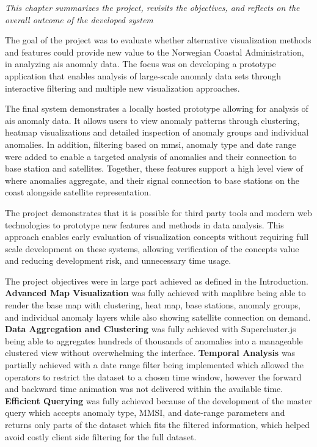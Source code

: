 
\textit{This chapter summarizes the project, revisits the objectives, and reflects on the overall outcome of the developed system}


The goal of the project was to evaluate whether alternative visualization methods and features could provide new value to the Norwegian Coastal Administration, in analyzing \acrshort{ais} anomaly data. The focus was on developing a prototype application that enables analysis of large-scale anomaly data sets through interactive filtering and multiple new visualization approaches. 


The final system demonstrates a locally hosted prototype allowing for analysis of \acrshort{ais} anomaly data. It allows users to view anomaly patterns through clustering, heatmap visualizations and detailed inspection of anomaly groups and individual anomalies. In addition, filtering based on \acrshort{mmsi}, anomaly type and date range were added to enable a targeted analysis of anomalies and their connection to base station and satellites. Together, these features support a high level view of where anomalies aggregate, and their signal connection to base stations on the coast alongside satellite representation. 

The project demonstrates that it is possible for third party tools and modern web technologies to prototype new features and methods in data analysis. This approach enables early evaluation of visualization concepts without requiring full scale development on these systems, allowing verification of the concepts value and reducing development risk, and unnecessary time usage. 

The project objectives were in large part achieved as defined in the Introduction. \textbf{Advanced Map Visualization} was fully achieved with \gls{maplibre} being able to render the base map with clustering, heat map, base stations, anomaly groups, and individual anomaly layers while also showing satellite connection on demand. \textbf{Data Aggregation and Clustering} was fully achieved with Supercluster.js being able to aggregates hundreds of thousands of anomalies into a manageable clustered view without overwhelming the interface. \textbf{Temporal Analysis} was partially achieved with a date range filter being implemented which allowed the operators to restrict the dataset to a chosen time window, however the forward and backward time animation was not delivered within the available time. \textbf{Efficient Querying} was fully achieved because of the development of the master query which accepts anomaly type, MMSI, and date-range parameters and returns only parts of the dataset which fits the filtered information, which helped avoid costly client side filtering for the full dataset.

